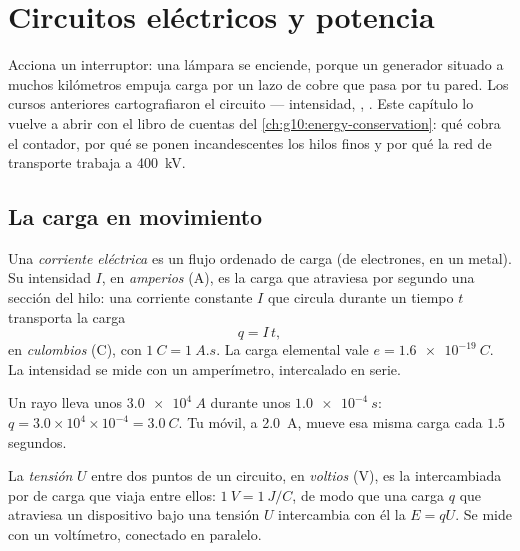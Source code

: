 \chapter{Circuitos eléctricos y potencia}\label{ch:g11:circuits-and-power}

Acciona un interruptor: una lámpara se enciende, porque un generador
situado a muchos kilómetros empuja carga por un lazo de cobre que pasa
por tu pared. Los cursos anteriores cartografiaron el circuito ---
intensidad, , . Este capítulo lo vuelve a abrir con el
libro de cuentas del \cref{ch:g10:energy-conservation}: qué cobra el
contador, por qué se ponen incandescentes los hilos finos y por qué la
red de transporte trabaja a \qty{400}{kV}.

\section{La carga en movimiento}

\begin{definition}\label{def:g11:circuits-and-power:current}
Una \emph{corriente eléctrica} es un flujo
ordenado de carga (de electrones, en un metal). Su intensidad $I$, en
\emph{amperios} (\unit{A}), es la carga que atraviesa por
segundo una sección del hilo: una corriente constante $I$ que circula
durante un tiempo $t$ transporta la carga
\[ q = I\,t , \]
en \emph{culombios} (\unit{C}), con
$\qty{1}{C} = \qty{1}{A.s}$. La carga elemental vale
$e = \qty{1.6e-19}{C}$. La intensidad se mide con un amperímetro,
intercalado en serie.
\end{definition}

\begin{example}\label{ex:g11:circuits-and-power:coulomb}
Un rayo lleva unos $\qty{3.0e4}{A}$ durante unos
$\qty{1.0e-4}{s}$: $q = 3.0\times10^{4} \times 10^{-4} = \qty{3.0}{C}$.
Tu móvil, a \qty{2.0}{A}, mueve esa misma carga cada $1.5$ segundos.
\end{example}

\begin{definition}\label{def:g11:circuits-and-power:voltage}
La \emph{tensión} $U$ entre dos puntos de un circuito, en
\emph{voltios} (\unit{V}), es la  intercambiada por
 de carga que viaja entre ellos: $\qty{1}{V} = \qty{1}{J/C}$, de
modo que una carga $q$ que atraviesa un dispositivo bajo una tensión $U$
intercambia con él la  $E = qU$. Se mide con un voltímetro,
conectado en paralelo.
\end{definition}

